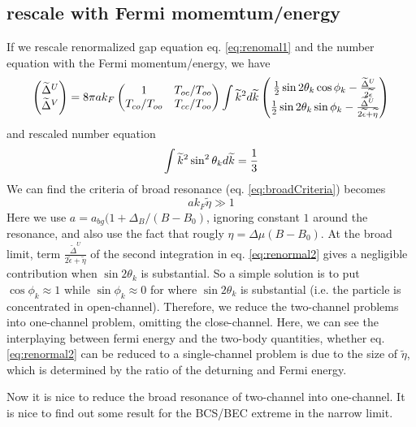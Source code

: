 \subsection{rescale with Fermi momemtum/energy}
If we rescale renormalized gap equation eq. \ref{eq:renomal1} and the number equation with the Fermi momentum/energy, we have 
\begin{equation}\label{eq:renormal2}
\begin{pmatrix}\widetilde\Delta^U\\\widetilde\Delta^V\end{pmatrix}=
8\pi{a}{k_F}\begin{pmatrix}1&T_{oc}/T_{oo}\\T_{co}/T_{oo}&T_{cc}/T_{oo}\end{pmatrix}
\int\widetilde{k}^2d\widetilde{k}
\begin{pmatrix}
\frac{1}{2}\sin2\theta_{k}\cos\phi_k-\frac{\widetilde\Delta^U}{2\widetilde\epsilon}\\
\frac{1}{2}\sin2\theta_{k}\sin\phi_k-\frac{\widetilde\Delta^U}{2\widetilde\epsilon+\widetilde{\eta}}
\end{pmatrix}
\end{equation}
and rescaled number equation
\begin{equation}
 \int\widetilde{k}^2\sin^2\theta_kd\widetilde{k}=\frac{1}{3}
\end{equation}
We can find the criteria of broad resonance (eq. \ref{eq:broadCriteria}) becomes 
\begin{equation}
 ak_F\widetilde{\eta}\gg1 
\end{equation}
Here we use $a=a_{bg}(1+\Delta_B/(B-B_0)$,  ignoring constant $1$ around the resonance, and also use the fact that rougly $\eta=\Delta\mu(B-B_0)$. At the broad limit, term $\frac{\widetilde\Delta^U}{2\widetilde\epsilon+\widetilde{\eta}}$ of the second integration in eq. \ref{eq:renormal2} gives a negligible contribution when $\sin2\theta_k$ is substantial.  So a simple solution is to put $\cos\phi_k\approx1$ while $\sin\phi_k\approx0$ for where $\sin2\theta_k$ is substantial (i.e. the particle is concentrated in open-channel).  Therefore, we reduce the two-channel problems into one-channel problem, omitting the close-channel. Here, we can see the interplaying between fermi energy and the two-body quantities, whether eq. \ref{eq:renormal2} can be reduced to a single-channel problem is due to the size of $\widetilde{\eta}$, which is determined by the ratio of the deturning and Fermi energy.  

Now it is nice to reduce the broad resonance of two-channel into one-channel.  It is nice to find out some result for the BCS/BEC extreme in the narrow limit. 